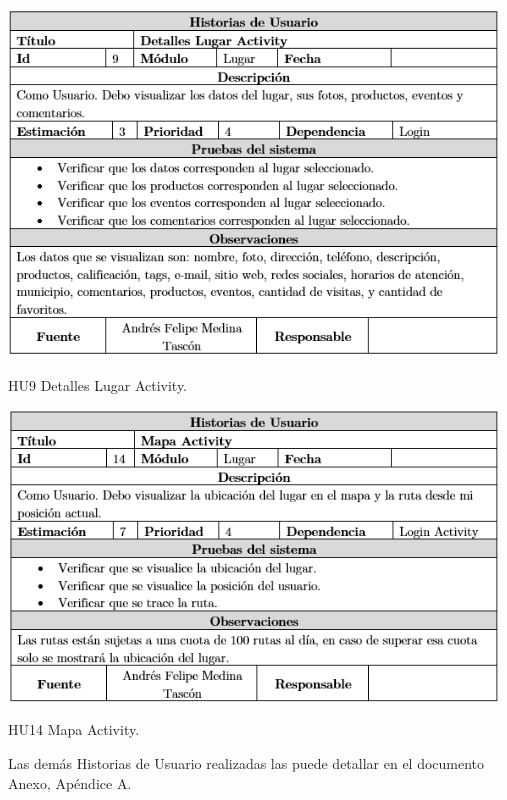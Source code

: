 \documentclass[12pt,letterpaper,openany]{book}
\begin{document}
\begin{table}[H]
\centering
\includegraphics[width=13cm]{./imagenes/HU/HU9}
\caption{HU9 Detalles Lugar Activity.}
\end{table}

\begin{table}[H]
\centering
\includegraphics[width=13cm]{./imagenes/HU/HU14}
\caption{HU14 Mapa Activity.}
\end{table}

Las demás Historias de Usuario realizadas las puede detallar en el documento Anexo, Apéndice A.
\end{document}
